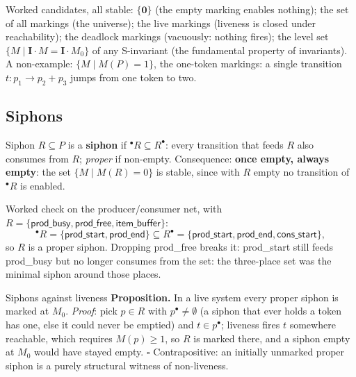 Worked candidates, all stable: $\{\mathbf{0}\}$ (the empty marking enables nothing); the set of all markings (the universe); the live markings (liveness is closed under reachability); the deadlock markings (vacuously: nothing fires); the level set $\{M \mid \mathbf{I} \cdot M = \mathbf{I} \cdot M_0\}$ of any S-invariant (the fundamental property of invariants). A non-example: $\{M \mid M(P) = 1\}$, the one-token markings: a single transition $t : p_1 \to p_2 + p_3$ jumps from one token to two.

\subsection{Siphons}

\begin{definitionbox}{Siphon}
$R \subseteq P$ is a \textbf{siphon} if ${}^\bullet R \subseteq R^\bullet$: every transition that feeds $R$ also consumes from $R$; \emph{proper} if non-empty. Consequence: \textbf{once empty, always empty}: the set $\{M \mid M(R) = 0\}$ is stable, since with $R$ empty no transition of ${}^\bullet R$ is enabled.
\end{definitionbox}

Worked check on the producer/consumer net, with $R = \{\textsf{prod\_busy}, \textsf{prod\_free}, \textsf{item\_buffer}\}$:
\[
  {}^\bullet R = \{\textsf{prod\_start}, \textsf{prod\_end}\}
  \subseteq
  R^\bullet = \{\textsf{prod\_start}, \textsf{prod\_end}, \textsf{cons\_start}\},
\]
so $R$ is a proper siphon. Dropping \textsf{prod\_free} breaks it: \textsf{prod\_start} still feeds \textsf{prod\_busy} but no longer consumes from the set: the three-place set was the minimal siphon around those places.

\begin{notebox}{Siphons against liveness}
\textbf{Proposition.} In a live system every proper siphon is marked at $M_0$. \textit{Proof}: pick $p \in R$ with $p^\bullet \neq \emptyset$ (a siphon that ever holds a token has one, else it could never be emptied) and $t \in p^\bullet$; liveness fires $t$ somewhere reachable, which requires $M(p) \geq 1$, so $R$ is marked there, and a siphon empty at $M_0$ would have stayed empty. \hfill$\square$ Contrapositive: an initially unmarked proper siphon is a purely structural witness of non-liveness.
\end{notebox}

